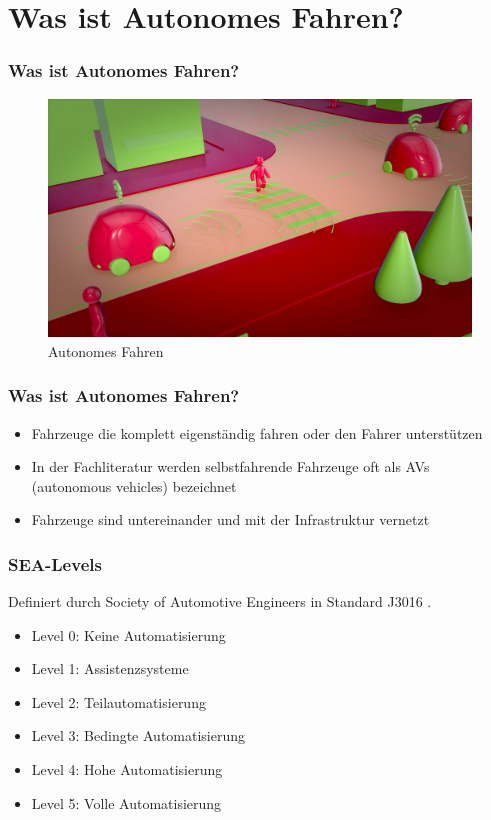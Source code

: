 \section{Was ist Autonomes Fahren?}

\begin{frame}
    \frametitle{Was ist Autonomes Fahren?}

    \begin{figure}[H]
        \centering
        \includegraphics[width=1.0\textwidth]{resources/images/car-4343633_1920.jpg}
        \caption{Autonomes Fahren \cite{car1_img}}
    \end{figure}
\end{frame}

\begin{frame}
    \frametitle{Was ist Autonomes Fahren?}
    
    \begin{itemize}
        \item Fahrzeuge die komplett eigenständig fahren oder den Fahrer unterstützen
        \item In der Fachliteratur werden selbstfahrende Fahrzeuge oft als AVs (autonomous vehicles) bezeichnet
        \item Fahrzeuge sind untereinander und mit der Infrastruktur vernetzt
    \end{itemize}
\end{frame}

\begin{frame}
    \frametitle{SEA-Levels}

    Definiert durch Society of Automotive Engineers \cite{websiteSAE} in Standard J3016 \cite{standardSAE}.

    \begin{itemize}
        \item Level 0: Keine Automatisierung
        \item Level 1: Assistenzsysteme
        \item Level 2: Teilautomatisierung
        \item Level 3: Bedingte Automatisierung
        \item Level 4: Hohe Automatisierung
        \item Level 5: Volle Automatisierung
    \end{itemize}
\end{frame}